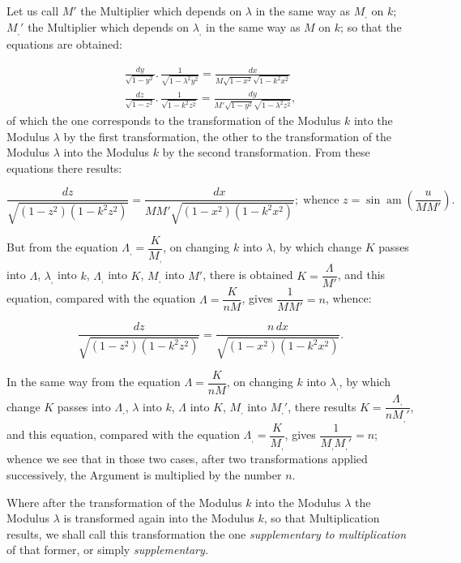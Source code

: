 \documentclass{article}
\begin{document}
Let us call $M'$ the Multiplier which depends on $\lambda$ in the same way as $M_{,}$ on $k$; $M_{,}'$ the Multiplier which depends on $\lambda_{,}$ in the same way as $M$ on $k$; so that the equations are obtained:

\[
\begin{gathered}
\frac{dy}{\sqrt{1-y^{2}}}.\,\frac{1}{\sqrt{1-\lambda^{2}y^{2}}}=\frac{dx}{M\sqrt{1-x^{2}}\sqrt{1-k^{2}x^{2}}}\\[2ex]
\frac{dz}{\sqrt{1-z^{2}}}.\,\frac{1}{\sqrt{1-k^{2}z^{2}}}=\frac{dy}{M'\sqrt{1-y^{2}}\sqrt{1-\lambda^{2}z^{2}}},
\end{gathered}
\]
of which the one corresponds to the transformation of the Modulus $k$ into the Modulus $\lambda$ by the first transformation, the other to the transformation of the Modulus $\lambda$ into the Modulus $k$ by the second transformation. From these equations there results:

\[
\frac{dz}{\sqrt{(1-z^{2})(1-k^{2}z^{2})}}=\frac{dx}{MM'\sqrt{(1-x^{2})(1-k^{2}x^{2})}};\;\text{whence }z=\sin\operatorname{am}\left(\frac{u}{MM'}\right).
\]

But from the equation $\Lambda_{,}=\dfrac{K}{M_{,}}$, on changing $k$ into $\lambda$, by which change $K$ passes into $\Lambda$, $\lambda_{,}$ into $k$, $\Lambda_{,}$ into $K$, $M_{,}$ into $M'$, there is obtained $K=\dfrac{\Lambda}{M'}$, and this equation, compared with the equation $\Lambda=\dfrac{K}{nM}$, gives $\dfrac{1}{MM'}=n$, whence:

\[
\frac{dz}{\sqrt{(1-z^{2})(1-k^{2}z^{2})}}=\frac{n\,dx}{\sqrt{(1-x^{2})(1-k^{2}x^{2})}}.
\]

In the same way from the equation $\Lambda=\dfrac{K}{nM}$, on changing $k$ into $\lambda_{,}$, by which change $K$ passes into $\Lambda_{,}$, $\lambda$ into $k$, $\Lambda$ into $K$, $M_{,}$ into $M_{,}'$, there results $K=\dfrac{\Lambda_{,}}{nM_{,}'}$, and this equation, compared with the equation $\Lambda_{,}=\dfrac{K}{M_{,}}$, gives $\dfrac{1}{M_{,}M_{,}'}=n$; whence we see that in those two cases, after two transformations applied successively, the Argument is multiplied by the number $n$.

Where after the transformation of the Modulus $k$ into the Modulus $\lambda$ the Modulus $\lambda$ is transformed again into the Modulus $k$, so that Multiplication results, we shall call this transformation the one \emph{supplementary to multiplication} of that former, or simply \emph{supplementary.}
\end{document}
